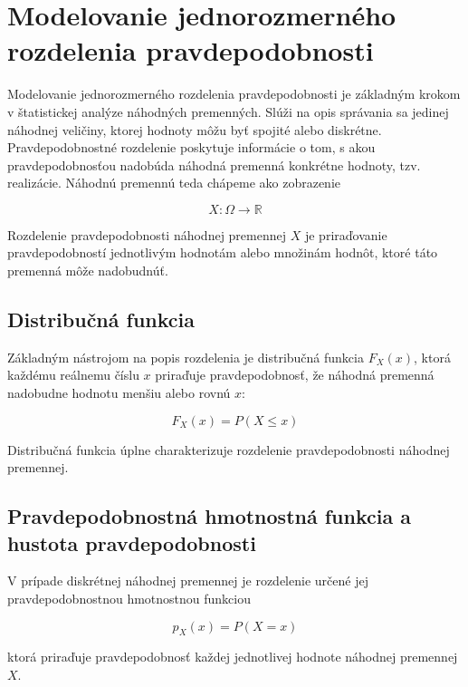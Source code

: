 \section{Modelovanie jednorozmerného rozdelenia pravdepodobnosti}\label{sec:1D_modelovanie}

Modelovanie jednorozmerného rozdelenia pravdepodobnosti je základným krokom v štatistickej analýze náhodných premenných. Slúži na opis správania sa jedinej náhodnej veličiny, ktorej hodnoty môžu byť spojité alebo diskrétne. Pravdepodobnostné rozdelenie poskytuje informácie o tom, s akou pravdepodobnosťou nadobúda náhodná premenná konkrétne hodnoty, tzv. realizácie. Náhodnú premennú teda chápeme ako zobrazenie 

\begin{equation*} 
X: \Omega \to \mathbb{R} 
\end{equation*}

Rozdelenie pravdepodobnosti náhodnej premennej $X$ je priraďovanie pravdepodobností jednotlivým hodnotám alebo množinám hodnôt, ktoré táto premenná môže nadobudnúť.

\subsection{Distribučná funkcia}

Základným nástrojom na popis rozdelenia je distribučná funkcia $F_X(x)$, ktorá každému reálnemu číslu $x$ priraďuje pravdepodobnosť, že náhodná premenná nadobudne hodnotu menšiu alebo rovnú $x$: 

\begin{equation*} 
F_X(x) = P(X \leq x) 
\end{equation*}

Distribučná funkcia úplne charakterizuje rozdelenie pravdepodobnosti náhodnej premennej. 

\subsection{Pravdepodobnostná hmotnostná funkcia a hustota pravdepodobnosti}

V prípade diskrétnej náhodnej premennej je rozdelenie určené jej pravdepodobnostnou hmotnostnou funkciou 

\begin{equation*} 
p_X(x) = P(X = x) 
\end{equation*} 

ktorá priraďuje pravdepodobnosť každej jednotlivej hodnote náhodnej premennej $X$.

